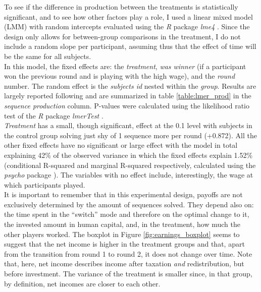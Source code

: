 To see if the difference in production between the treatments is statistically significant, and to see how other factors play a role, I used a linear mixed model (LMM) with random intercepts evaluated using the \textit{R} package \textit{lme4} \citep{bates2015}. Since the design only allows for between-group comparisons in the treatment, I do not include a random slope per participant, assuming thus that the effect of time will be the same for all subjects.\\

In this model, the fixed effects are: the \textit{treatment}, \textit{was winner} (if a participant won the previous round and is playing with the high wage), and the \textit{round} number. The random effect is the \textit{subjects id} nested within the \textit{group}. Results are largely reported following \cite{barr2013} and are summarized in table \ref{table:lmer_prod} in the \textit{sequence production} column. P-values were calculated using the likelihood ratio test of the \textit{R} package \textit{lmerTest} \citep{kuznetsova2017}.\\

\textit{Treatment} has a small, though significant, effect at the 0.1 level with subjects in the control group solving just shy of 1 sequence more per round (+0.872). All the other fixed effects have no significant or large effect with the model in total explaining 42\% of the observed variance in which the fixed effects explain 1.52\% (conditional R-squared and marginal R-squared respectively, calculated using the \textit{psycho} package \citep{makowski2018}). The variables with no effect include, interestingly, the wage at which participants played.\\


It is important to remember that in this experimental design, payoffs are not exclusively determined by the amount of sequences solved. They depend also on: the time spent in the ``switch'' mode and therefore on the optimal change to it, the invested amount in human capital, and, in the treatment, how much the other players worked. The boxplot in Figure \ref{fig:earnings_boxplot} seems to suggest that the net income is higher in the treatment groups and that, apart from the transition from round 1 to round 2, it does not change over time. Note that, here, net income describes income after taxation \textit{and} redistribution, but before investment. The variance of the treatment is smaller since, in that group, by definition, net incomes are closer to each other.\\

